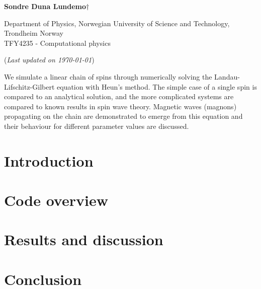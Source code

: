 


	
\begin{titlepage}
	\begin{center}
	\setlength{\parskip}{0em}
	\thispagestyle{titlepage}
	

	\vspace{4mm}
	
	\large{\textbf{Sondre Duna Lundemo}}$\dagger$
	
	\normalsize{Department of Physics, Norwegian University of Science and Technology, Trondheim Norway \\
	TFY4235 - Computational physics
	}

	(\textit{Last updated on \today})
	\end{center}

	\setlength{\parindent}{2em}
	
		We simulate a linear chain of spins through numerically solving the Landau-Lifschitz-Gilbert equation with Heun's method. The simple case of a single spin is compared to an analytical solution, and the more complicated systems are compared to known results in spin wave theory. Magnetic waves (magnons) propagating on the chain are demonstrated to emerge from this equation and their behaviour for different parameter values are discussed.
	
	\begin{figure}
		
	\end{figure}
	

\end{titlepage}

\newpage
\setlength{\parskip}{0em}
\tableofcontents
\setlength{\parskip}{1em}
\newpage

\part{Introduction}


\newpage

\part{Code overview}


\newpage

\part{Results and discussion}



\newpage
\part{Conclusion}





